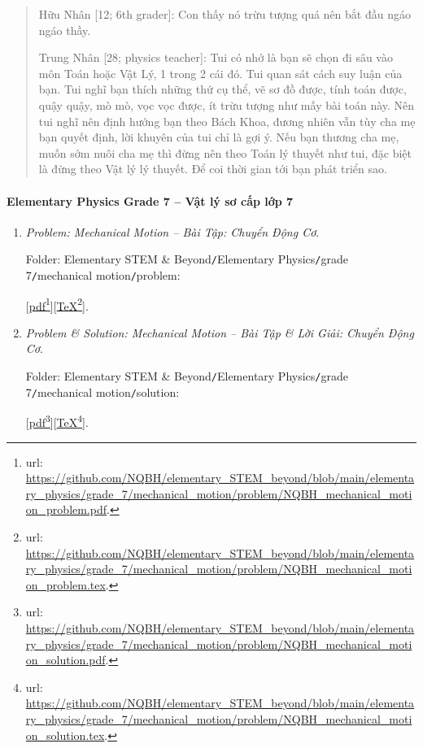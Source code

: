 \documentclass[12pt]{article}
\begin{document}
\begin{quote}
	{\sf Hữu Nhân [12; 6th grader]}: Con thấy nó trừu tượng quá nên bắt đầu ngáo ngáo thầy.
	\vspace{2mm}
	
	{\sf Trung Nhân [28; physics teacher]}: Tui có nhớ là bạn sẽ chọn đi sâu vào môn Toán hoặc Vật Lý, 1 trong 2 cái đó. Tui quan sát cách suy luận của bạn. Tui nghĩ bạn thích những thứ cụ thể, vẽ sơ đồ được, tính toán được, quậy quậy, mò mò, vọc vọc được, ít trừu tượng như mấy bài toán này. Nên tui nghĩ nên định hướng bạn theo Bách Khoa, đương nhiên vẫn tùy cha mẹ bạn quyết định, lời khuyên của tui chỉ là gợi ý. Nếu bạn thương cha mẹ, muốn sớm nuôi cha mẹ thì đừng nên theo Toán lý thuyết như tui, đặc biệt là đừng theo Vật lý lý thuyết. Để coi thời gian tới bạn phát triển sao.
\end{quote}

\paragraph{Elementary Physics Grade 7 -- Vật lý sơ cấp lớp 7}

\begin{enumerate}
	\item {\it Problem: Mechanical Motion -- Bài Tập: Chuyển Động Cơ}.
	
	Folder: {\sf Elementary STEM \& Beyond{\tt/}Elementary Physics{\tt/}grade 7{\tt/}mechanical motion{\tt/}problem}:
	
	[\href{https://github.com/NQBH/elementary_STEM_beyond/blob/main/elementary_physics/grade_7/mechanical_motion/problem/NQBH_mechanical_motion_problem.pdf}{pdf}\footnote{{\sc url}: \url{https://github.com/NQBH/elementary_STEM_beyond/blob/main/elementary_physics/grade_7/mechanical_motion/problem/NQBH_mechanical_motion_problem.pdf}.}][\href{https://github.com/NQBH/elementary_STEM_beyond/blob/main/elementary_physics/grade_7/mechanical_motion/problem/NQBH_mechanical_motion_problem.tex}{\TeX}\footnote{{\sc url}: \url{https://github.com/NQBH/elementary_STEM_beyond/blob/main/elementary_physics/grade_7/mechanical_motion/problem/NQBH_mechanical_motion_problem.tex}.}].
	\item {\it Problem \& Solution: Mechanical Motion -- Bài Tập \& Lời Giải: Chuyển Động Cơ}.
	
	Folder: {\sf Elementary STEM \& Beyond{\tt/}Elementary Physics{\tt/}grade 7{\tt/}mechanical motion{\tt/}solution}:
	
	[\href{https://github.com/NQBH/elementary_STEM_beyond/blob/main/elementary_physics/grade_7/mechanical_motion/problem/NQBH_mechanical_motion_solution.pdf}{pdf}\footnote{{\sc url}: \url{https://github.com/NQBH/elementary_STEM_beyond/blob/main/elementary_physics/grade_7/mechanical_motion/problem/NQBH_mechanical_motion_solution.pdf}.}][\href{https://github.com/NQBH/elementary_STEM_beyond/blob/main/elementary_physics/grade_7/mechanical_motion/problem/NQBH_mechanical_motion_solution.tex}{\TeX}\footnote{{\sc url}: \url{https://github.com/NQBH/elementary_STEM_beyond/blob/main/elementary_physics/grade_7/mechanical_motion/problem/NQBH_mechanical_motion_solution.tex}.}].
\end{enumerate}
\end{document}

